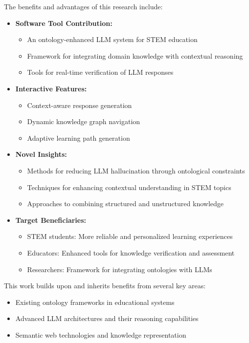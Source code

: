 \documentclass[a4paper,11pt,oneside]{article}
\begin{document}
  The benefits and advantages of this research include:
  \begin{itemize}
      \item \textbf{Software Tool Contribution:}
          \begin{itemize}
              \item An ontology-enhanced LLM system for STEM education
              \item Framework for integrating domain knowledge with contextual reasoning
              \item Tools for real-time verification of LLM responses
          \end{itemize}
      
      \item \textbf{Interactive Features:}
          \begin{itemize}
              \item Context-aware response generation
              \item Dynamic knowledge graph navigation
              \item Adaptive learning path generation
          \end{itemize}
      
      \item \textbf{Novel Insights:}
          \begin{itemize}
              \item Methods for reducing LLM hallucination through ontological constraints
              \item Techniques for enhancing contextual understanding in STEM topics
              \item Approaches to combining structured and unstructured knowledge
          \end{itemize}
      
      \item \textbf{Target Beneficiaries:}
          \begin{itemize}
              \item STEM students: More reliable and personalized learning experiences
              \item Educators: Enhanced tools for knowledge verification and assessment
              \item Researchers: Framework for integrating ontologies with LLMs
          \end{itemize}
  \end{itemize}

  This work builds upon and inherits benefits from several key areas:
  \begin{itemize}
      \item Existing ontology frameworks in educational systems
      \item Advanced LLM architectures and their reasoning capabilities
      \item Semantic web technologies and knowledge representation
  \end{itemize}
\end{document}
